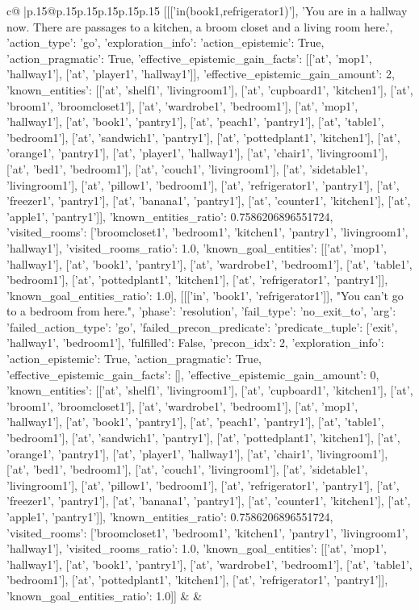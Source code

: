 \documentclass{article}
\begin{document}
{\begin{supertabular}{c@{$\;$}|p{.15\linewidth}@{}p{.15\linewidth}p{.15\linewidth}p{.15\linewidth}p{.15\linewidth}p{.15\linewidth}}
{{{	 [[['in(book1,refrigerator1)'], 'You are in a hallway now. There are passages to a kitchen, a broom closet and a living room here.', {'action_type': 'go', 'exploration_info': {'action_epistemic': True, 'action_pragmatic': True, 'effective_epistemic_gain_facts': [['at', 'mop1', 'hallway1'], ['at', 'player1', 'hallway1']], 'effective_epistemic_gain_amount': 2, 'known_entities': [['at', 'shelf1', 'livingroom1'], ['at', 'cupboard1', 'kitchen1'], ['at', 'broom1', 'broomcloset1'], ['at', 'wardrobe1', 'bedroom1'], ['at', 'mop1', 'hallway1'], ['at', 'book1', 'pantry1'], ['at', 'peach1', 'pantry1'], ['at', 'table1', 'bedroom1'], ['at', 'sandwich1', 'pantry1'], ['at', 'pottedplant1', 'kitchen1'], ['at', 'orange1', 'pantry1'], ['at', 'player1', 'hallway1'], ['at', 'chair1', 'livingroom1'], ['at', 'bed1', 'bedroom1'], ['at', 'couch1', 'livingroom1'], ['at', 'sidetable1', 'livingroom1'], ['at', 'pillow1', 'bedroom1'], ['at', 'refrigerator1', 'pantry1'], ['at', 'freezer1', 'pantry1'], ['at', 'banana1', 'pantry1'], ['at', 'counter1', 'kitchen1'], ['at', 'apple1', 'pantry1']], 'known_entities_ratio': 0.7586206896551724, 'visited_rooms': ['broomcloset1', 'bedroom1', 'kitchen1', 'pantry1', 'livingroom1', 'hallway1'], 'visited_rooms_ratio': 1.0, 'known_goal_entities': [['at', 'mop1', 'hallway1'], ['at', 'book1', 'pantry1'], ['at', 'wardrobe1', 'bedroom1'], ['at', 'table1', 'bedroom1'], ['at', 'pottedplant1', 'kitchen1'], ['at', 'refrigerator1', 'pantry1']], 'known_goal_entities_ratio': 1.0}}], [[['in', 'book1', 'refrigerator1']], "You can't go to a bedroom from here.", {'phase': 'resolution', 'fail_type': 'no_exit_to', 'arg': {'failed_action_type': 'go', 'failed_precon_predicate': {'predicate_tuple': ['exit', 'hallway1', 'bedroom1'], 'fulfilled': False, 'precon_idx': 2}}, 'exploration_info': {'action_epistemic': True, 'action_pragmatic': True, 'effective_epistemic_gain_facts': [], 'effective_epistemic_gain_amount': 0, 'known_entities': [['at', 'shelf1', 'livingroom1'], ['at', 'cupboard1', 'kitchen1'], ['at', 'broom1', 'broomcloset1'], ['at', 'wardrobe1', 'bedroom1'], ['at', 'mop1', 'hallway1'], ['at', 'book1', 'pantry1'], ['at', 'peach1', 'pantry1'], ['at', 'table1', 'bedroom1'], ['at', 'sandwich1', 'pantry1'], ['at', 'pottedplant1', 'kitchen1'], ['at', 'orange1', 'pantry1'], ['at', 'player1', 'hallway1'], ['at', 'chair1', 'livingroom1'], ['at', 'bed1', 'bedroom1'], ['at', 'couch1', 'livingroom1'], ['at', 'sidetable1', 'livingroom1'], ['at', 'pillow1', 'bedroom1'], ['at', 'refrigerator1', 'pantry1'], ['at', 'freezer1', 'pantry1'], ['at', 'banana1', 'pantry1'], ['at', 'counter1', 'kitchen1'], ['at', 'apple1', 'pantry1']], 'known_entities_ratio': 0.7586206896551724, 'visited_rooms': ['broomcloset1', 'bedroom1', 'kitchen1', 'pantry1', 'livingroom1', 'hallway1'], 'visited_rooms_ratio': 1.0, 'known_goal_entities': [['at', 'mop1', 'hallway1'], ['at', 'book1', 'pantry1'], ['at', 'wardrobe1', 'bedroom1'], ['at', 'table1', 'bedroom1'], ['at', 'pottedplant1', 'kitchen1'], ['at', 'refrigerator1', 'pantry1']], 'known_goal_entities_ratio': 1.0}}]] 
	  } 
	   } 
	   } 
	 & & \\ 
 


\end{supertabular}}
\end{document}
